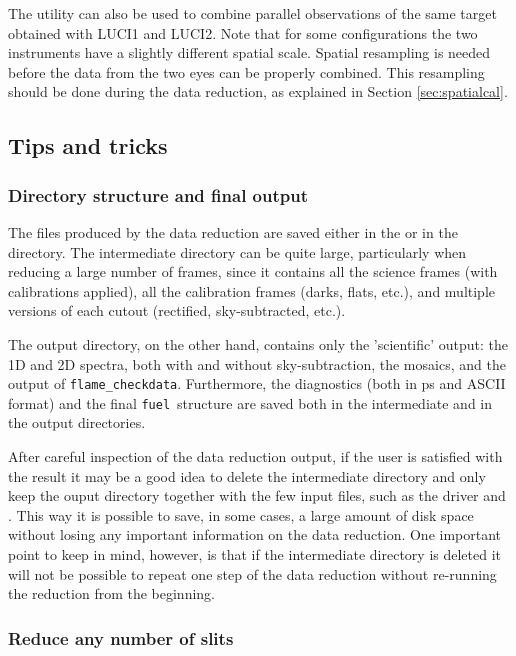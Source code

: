 \documentclass[a4paper]{article}
\newcommand{\fuel}{\texttt{fuel}}
\begin{document}
\begin{sloppypar}
The utility  can also be used to combine parallel observations of the same target obtained with LUCI1 and LUCI2. Note that for some configurations the two instruments have a slightly different spatial scale. Spatial resampling is needed before the data from the two eyes can be properly combined. This resampling should be done during the data reduction, as explained in Section \ref{sec:spatialcal}.


\subsection{Tips and tricks}
\label{sec:tips}

\subsubsection{Directory structure and final output}
\label{sec:dir_structure}

The files produced by the data reduction are saved either in the  or in the  directory. The intermediate directory can be quite large, particularly when reducing a large number of frames, since it contains all the science frames (with calibrations applied), all the calibration frames (darks, flats, etc.), and multiple versions of each cutout (rectified, sky-subtracted, etc.).

The output directory, on the other hand, contains only the 'scientific' output: the 1D and 2D spectra, both with and without sky-subtraction, the mosaics, and the output of \texttt{flame\_checkdata}. Furthermore, the diagnostics (both in ps and ASCII format) and the final \fuel\ structure are saved both in the intermediate and in the output directories.

After careful inspection of the data reduction output, if the user is satisfied with the result it may be a good idea to delete the intermediate directory and only keep the ouput directory together with the few input files, such as the driver and . This way it is possible to save, in some cases, a large amount of disk space without losing any important information on the data reduction. One important point to keep in mind, however, is that if the intermediate directory is deleted it will not be possible to repeat one step of the data reduction without re-running the reduction from the beginning.


\subsubsection{Reduce any number of slits}


\end{sloppypar}
\end{document}
